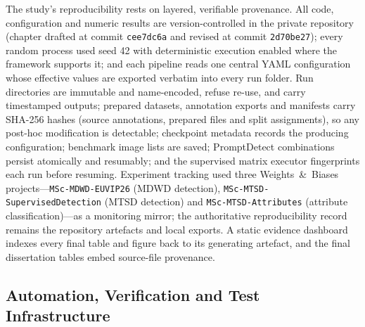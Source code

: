 The study's reproducibility rests on layered, verifiable provenance. All code, configuration and numeric results are version-controlled in the private repository (chapter drafted at commit \texttt{cee7dc6a} and revised at commit \texttt{2d70be27}); every random process used seed 42 with deterministic execution enabled where the framework supports it; and each pipeline reads one central YAML configuration whose effective values are exported verbatim into every run folder. Run directories are immutable and name-encoded, refuse re-use, and carry timestamped outputs; prepared datasets, annotation exports and manifests carry SHA-256 hashes (source annotations, prepared files and split assignments), so any post-hoc modification is detectable; checkpoint metadata records the producing configuration; benchmark image lists are saved; PromptDetect combinations persist atomically and resumably; and the supervised matrix executor fingerprints each run before resuming. Experiment tracking used three Weights~\&~Biases projects---\texttt{MSc-\allowbreak MDWD-\allowbreak EUVIP26} (MDWD detection), \texttt{MSc-MTSD-\allowbreak SupervisedDetection} (MTSD detection) and \texttt{MSc-\allowbreak MTSD-\allowbreak Attributes} (attribute classification)---as a monitoring mirror; the authoritative reproducibility record remains the repository artefacts and local exports. A static evidence dashboard indexes every final table and figure back to its generating artefact, and the final dissertation tables embed source-file provenance.

\subsection{Automation, Verification and Test Infrastructure}

